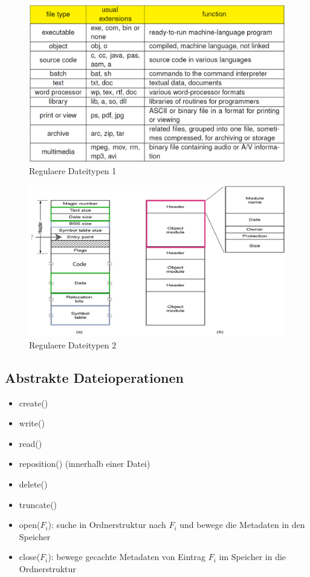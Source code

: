 \documentclass[a4paper]{scrreprt}
\begin{document}
\begin{figure}[ht]
\centering
\includegraphics[scale=0.3]{regular_filetypes.png}
\caption{Regulaere Dateitypen 1}
\end{figure}

\begin{figure}[ht]
\centering
\includegraphics[scale=0.4]{regular_filetypes2.png}
\caption{Regulaere Dateitypen 2}
\end{figure}

\subsection{Abstrakte Dateioperationen}
\begin{itemize}
	\item create()
	\item write()
	\item read()
	\item reposition() (innerhalb einer Datei)
	\item delete()
	\item truncate()
	\item open($F_i$): suche in Ordnerstruktur nach $F_i$ und bewege die Metadaten in den Speicher
	\item close($F_i$): bewege gecachte Metadaten von Eintrag $F_i$ im Speicher in die Ordnerstruktur
\end{itemize}
\end{document}

